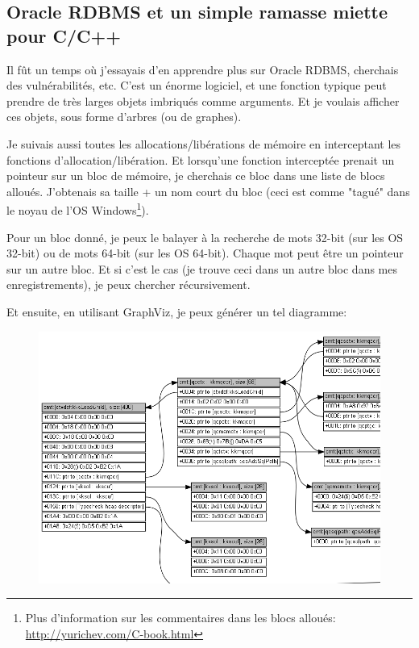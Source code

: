 \subsection{Oracle RDBMS et un simple ramasse miette pour C/C++}

Il fût un temps où j'essayais d'en apprendre plus sur Oracle RDBMS, cherchais des vulnérabilités, etc.
C'est un énorme logiciel, et une fonction typique peut prendre de très larges objets
imbriqués comme arguments.
Et je voulais afficher ces objets, sous forme d'arbres (ou de graphes).

Je suivais aussi toutes les allocations/libérations de mémoire en interceptant les
fonctions d'allocation/libération.
Et lorsqu'une fonction interceptée prenait un pointeur sur un bloc de mémoire, je
cherchais ce bloc dans une liste de blocs alloués.
J'obtenais sa taille + un nom court du bloc
(ceci est comme "tagué" dans le noyau de l'OS Windows\footnote{Plus d'information
sur les commentaires dans les blocs alloués:  \CNotes{} \url{http://yurichev.com/C-book.html}}).

Pour un bloc donné, je peux le balayer à la recherche de mots 32-bit (sur les OS
32-bit) ou de mots 64-bit (sur les OS 64-bit).
Chaque mot peut être un pointeur sur un autre bloc.
Et si c'est le cas (je trouve ceci dans un autre bloc dans mes enregistrements),
je peux chercher récursivement.

Et ensuite, en utilisant GraphViz, je peux générer un tel diagramme:

\begin{figure}[H]
\centering
\includegraphics[scale=0.55]{advanced/450_more_ptrs/oracle2_crop.png}
\end{figure}

